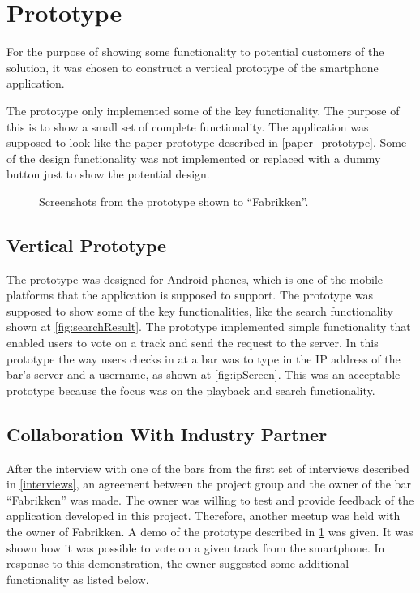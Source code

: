 \section{Prototype}
\label{sec:prototype}
For the purpose of showing some functionality to potential customers of the solution, it was chosen to construct a vertical prototype of the smartphone application.

The prototype only implemented some of the key functionality. The purpose of this is to show a small set of complete functionality. The application was supposed to look like the paper prototype described in \cref{paper_prototype}. Some of the design functionality was not implemented or replaced with a dummy button just to show the potential design.

\begin{figure}[hbtp]
  \centering
  \caption{Screenshots from the prototype shown to \enquote{Fabrikken}.}
\end{figure}

\subsection{Vertical Prototype}
\label{sub:vertical_prototype}

The prototype was designed for Android phones, which is one of the mobile platforms that the application is supposed to support. The prototype was supposed to show some of the key functionalities, like the search functionality shown at \cref{fig:searchResult}. The prototype implemented simple functionality that enabled users to vote on a track and send the request to the server. In this prototype the way users checks in at a bar was to type in the IP address of the bar's server and a username, as shown at \cref{fig:ipScreen}. This was an acceptable prototype because the focus was on the playback and search functionality.

\subsection{Collaboration With Industry Partner}
\label{sec:fabrikken}
After the interview with one of the bars from the first set of interviews described in \cref{interviews}, an agreement between the project group and the owner of the bar \enquote{Fabrikken} was made. The owner was willing to test and provide feedback of the application developed in this project. Therefore, another meetup was held with the owner of Fabrikken. A demo of the prototype described in \cref{sec:prototype} was given. It was shown how it was possible to vote on a given track from the smartphone. In response to this demonstration, the owner suggested some additional functionality as listed below.

